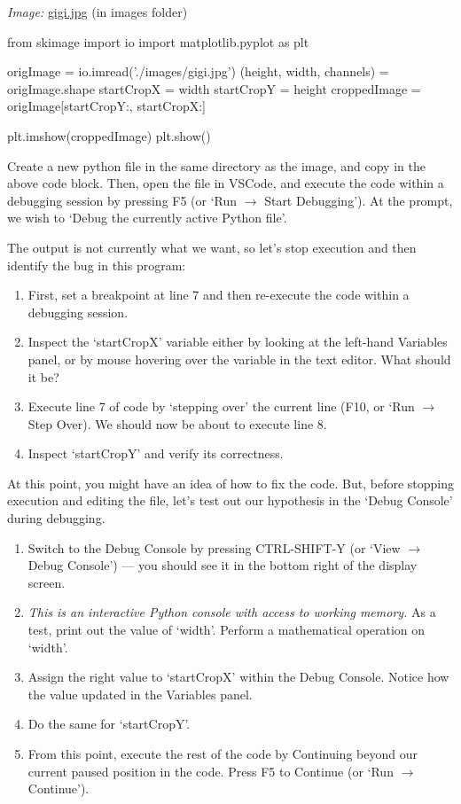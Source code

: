 \documentclass[11pt]{article}
\begin{document}
\emph{Image:} \href{images/gigi.jpg}{gigi.jpg} (in images folder)

\begin{python}
from skimage import io
import matplotlib.pyplot as plt

origImage = io.imread('./images/gigi.jpg')
(height, width, channels) = origImage.shape
startCropX = width %
startCropY = height %
croppedImage = origImage[startCropY:, startCropX:]

plt.imshow(croppedImage)
plt.show()
\end{python}

\begin{tcolorbox}[colback=orange!5!white,colframe=orange!75!black,enhanced jigsaw,breakable,pad at break*=1mm]
Create a new python file in the same directory as the image, and copy in the above code block. Then, open the file in VSCode, and execute the code within a debugging session by pressing F5 (or `Run $\rightarrow$ Start Debugging'). At the prompt, we wish to `Debug the currently active Python file'.

The output is not currently what we want, so let's stop execution and then identify the bug in this program:
\begin{enumerate}
    \item First, set a breakpoint at line 7 and then re-execute the code within a debugging session.
    \item Inspect the `startCropX' variable either by looking at the left-hand Variables panel, or by mouse hovering over the variable in the text editor. What should it be?
    \item Execute line 7 of code by `stepping over' the current line (F10, or `Run $\rightarrow$ Step Over). We should now be about to execute line 8.
    \item Inspect `startCropY' and verify its correctness.
\end{enumerate}

At this point, you might have an idea of how to fix the code. But, before stopping execution and editing the file, let's test out our hypothesis in the `Debug Console' during debugging.

\begin{enumerate}
    \item Switch to the Debug Console by pressing CTRL-SHIFT-Y (or `View $\rightarrow$ Debug Console') --- you should see it in the bottom right of the display screen.
    \item \emph{This is an interactive Python console with access to working memory.} As a test, print out the value of `width'. Perform a mathematical operation on `width'.
    \item Assign the right value to `startCropX' within the Debug Console. Notice how the value updated in the Variables panel.
    \item Do the same for `startCropY'.
    \item From this point, execute the rest of the code by Continuing beyond our current paused position in the code. Press F5 to Continue (or `Run $\rightarrow$ Continue').
\end{enumerate}


\end{tcolorbox}
\end{document}
